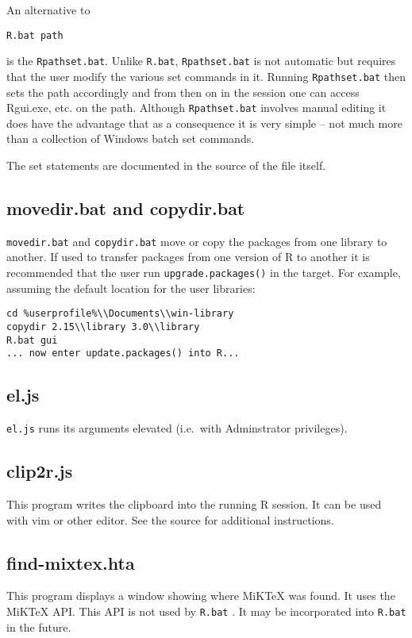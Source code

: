 An alternative to

\begin{verbatim}
R.bat path 
\end{verbatim}

is the \texttt{Rpathset.bat}. Unlike \texttt{R.bat},
\texttt{Rpathset.bat} is not automatic but requires that the user modify
the various set commands in it. Running \texttt{Rpathset.bat} then sets
the path accordingly and from then on in the session one can access
Rgui.exe, etc. on the path. Although \texttt{Rpathset.bat} involves
manual editing it does have the advantage that as a consequence it is
very simple -- not much more than a collection of Windows batch set
commands.

The set statements are documented in the source of the file itself.

\subsection{movedir.bat and copydir.bat}

\texttt{movedir.bat} and \texttt{copydir.bat} move or copy the packages
from one library to another. If used to transfer packages from one
version of R to another it is recommended that the user run
\texttt{upgrade.packages()} in the target. For example, assuming the
default location for the user libraries:

\begin{verbatim}
cd %userprofile%\\Documents\\win-library
copydir 2.15\\library 3.0\\library
R.bat gui 
... now enter update.packages() into R...
\end{verbatim}

\subsection{el.js}

\texttt{el.js} runs its arguments elevated (i.e.~with Adminstrator
privileges).

\subsection{clip2r.js}

This program writes the clipboard into the running R session. It can be
used with vim or other editor. See the source for additional
instructions.

\subsection{find-mixtex.hta}

This program displays a window showing where MiKTeX was found. It uses
the MiKTeX API. This API is not used by \texttt{R.bat} . It may be
incorporated into \texttt{R.bat} in the future.
